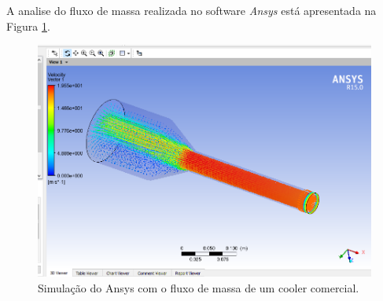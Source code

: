 



		A analise do fluxo de massa realizada no software \textit{Ansys} está apresentada na Figura \ref{img:analise_fluxo}.

		\begin{figure}[H]
			\centering
			\includegraphics[scale=0.4]{figuras/analise_fluxo.png}
			\caption{Simulação do Ansys com o fluxo de massa de um cooler comercial.}
			\label{img:analise_fluxo}
		\end{figure}



